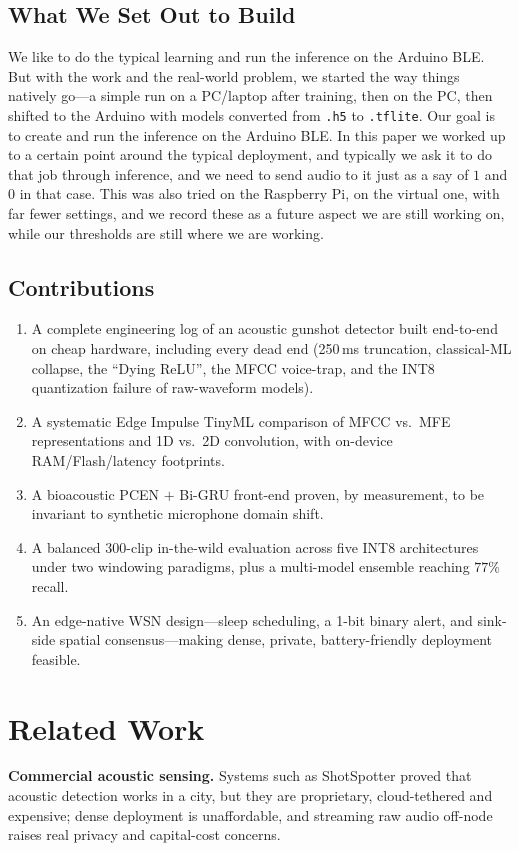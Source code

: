 \documentclass[conference]{IEEEtran}
\begin{document}
\subsection{What We Set Out to Build}
We like to do the typical learning and run the inference on the Arduino BLE. But with the work and the
real-world problem, we started the way things natively go---a simple run on a PC/laptop after training, then
on the PC, then shifted to the Arduino with models converted from \texttt{.h5} to \texttt{.tflite}. Our goal
is to create and run the inference on the Arduino BLE. In this paper we worked up to a certain point around
the typical deployment, and typically we ask it to do that job through inference, and we need to send audio
to it just as a say of $1$ and $0$ in that case. This was also tried on the Raspberry Pi, on the virtual one,
with far fewer settings, and we record these as a future aspect we are still working on, while our thresholds
are still where we are working.

\subsection{Contributions}
\begin{enumerate}
    \item A complete engineering log of an acoustic gunshot detector built end-to-end on cheap hardware,
    including every dead end (250\,ms truncation, classical-ML collapse, the ``Dying ReLU'', the MFCC
    voice-trap, and the INT8 quantization failure of raw-waveform models).
    \item A systematic Edge Impulse TinyML comparison of MFCC vs.\ MFE representations and 1D vs.\ 2D
    convolution, with on-device RAM/Flash/latency footprints.
    \item A bioacoustic PCEN $+$ Bi-GRU front-end proven, by measurement, to be invariant to synthetic
    microphone domain shift.
    \item A balanced 300-clip in-the-wild evaluation across five INT8 architectures under two windowing
    paradigms, plus a multi-model ensemble reaching $77\%$ recall.
    \item An edge-native WSN design---sleep scheduling, a 1-bit binary alert, and sink-side spatial
    consensus---making dense, private, battery-friendly deployment feasible.
\end{enumerate}

\section{Related Work}
\label{sec:related}
\textbf{Commercial acoustic sensing.} Systems such as ShotSpotter proved that acoustic detection works in a
city, but they are proprietary, cloud-tethered and expensive; dense deployment is unaffordable, and streaming
raw audio off-node raises real privacy and capital-cost concerns.
\end{document}
